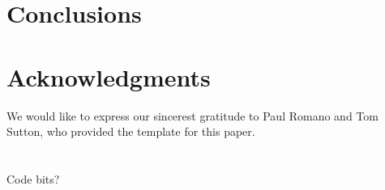 \documentclass{mc2015}
\begin{document}
\section{Conclusions}


\section{Acknowledgments}

We would like to express our sincerest gratitude to Paul Romano and Tom Sutton, who provided the template for this paper.

\setlength{\baselineskip}{12pt}




\appendix
\section{}

Code bits?
\end{document}
